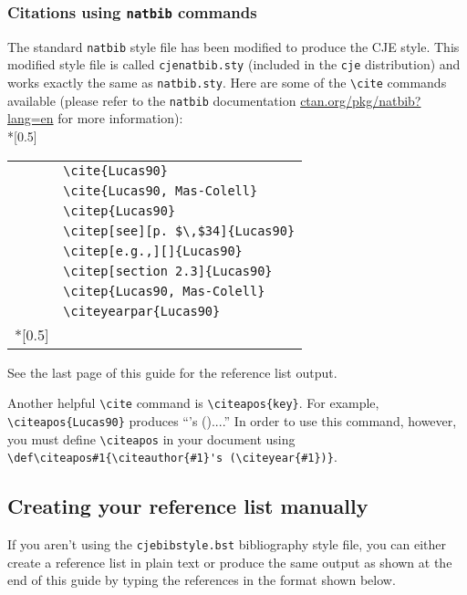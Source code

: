 \documentclass{cje}          %
\theoremstyle{plain}%
\theoremstyle{definition}
\theoremstyle{remark}
\def\citeapos#1{\citeauthor{#1}'s (\citeyear{#1})}
\begin{document}
\subsubsection{Citations using \texttt{natbib} commands}
The standard \texttt{natbib} style file has been modified to produce the CJE style. This modified style file is called \texttt{cjenatbib.sty} (included in the \texttt{cje} distribution) and works exactly the same as \texttt{natbib.sty}. Here are some of the \verb"\cite" commands  available (please refer to the \texttt{natbib} documentation \href{https://www.ctan.org/pkg/natbib?lang=en}{ctan.org/pkg/natbib?lang=en} for more information):\\*[0.5\baselineskip]
\begin{tabular}{@{}ll}
\cite{Lucas90}
    & \indexsize\verb"\cite{Lucas90}"\\
\cite{Lucas90, Mas-Colell}
    & \indexsize\verb"\cite{Lucas90, Mas-Colell}"\\
\citep{Lucas90}
   & \indexsize\verb"\citep{Lucas90}"\\
\citep[see][p. $\,$34]{Lucas90}
   & \indexsize\verb"\citep[see][p. $\,$34]{Lucas90}"\\
\citep[e.g.,][]{Lucas90}
   & \indexsize\verb"\citep[e.g.,][]{Lucas90}"\\
\citep[section 2.3]{Lucas90}
   & \indexsize\verb"\citep[section 2.3]{Lucas90}"\\
\citep{Lucas90, Mas-Colell}
   & \indexsize\verb"\citep{Lucas90, Mas-Colell}"\\
\citeyearpar{Lucas90}
   & \indexsize\verb"\citeyearpar{Lucas90}"\\*[0.5\baselineskip]
\end{tabular}

\noindent See the last page of this guide for the reference list output.

Another helpful \verb"\cite" command is \verb"\citeapos{key}". For example, \verb"\citeapos{Lucas90}" produces  ``\citeapos{Lucas90}....'' In order to use this command, however, you must define \verb"\citeapos" in your document using \verb"\def\citeapos#1{\citeauthor{#1}'s (\citeyear{#1})}".   

\subsection{Creating your reference list manually}
If you aren't using the \texttt{cjebibstyle.bst} bibliography style file, you can either create a reference list in plain text or produce the same output as shown at the end of this guide by typing the references in the format shown below. \\
\end{document}
